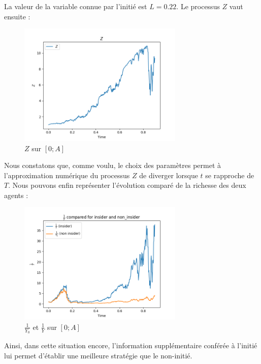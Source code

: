 \documentclass[../finalreport.tex]{subfiles}
\begin{document}
\par La valeur de la variable connue par l'initié est $L = 0.22$. Le processus $Z$ vaut ensuite :

\begin{figure}[H]
  \centering
    \includegraphics[width=0.7\textwidth]{images/simulation_2/Z.png}
  \caption{$Z$ sur $\left[0; A \right]$}
\end{figure}

\par Nous constatons que, comme voulu, le choix des paramètres permet à l'approximation numérique du processus $Z$ de diverger lorsque $t$ se rapproche de $T$. Nous pouvons enfin représenter l'évolution comparé de la richesse des deux agents :

\begin{figure}[H]
  \centering
    \includegraphics[width=0.7\textwidth]{images/simulation_2/compared_wealths.png}
  \caption{$\frac{1}{Y_0}$ et $\frac{1}{Y}$ sur $\left[0; A \right]$}
\end{figure}

\par Ainsi, dans cette situation encore, l'information supplémentaire conférée à l'initié lui permet d'établir une meilleure stratégie que le non-initié.
\end{document}
